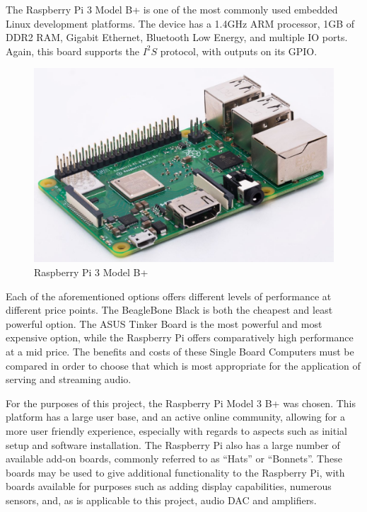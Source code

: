 \documentclass[11pt,a4paper,headinclude=false,footinclude=false]{scrreprt}
\begin{document}
The Raspberry Pi 3 Model B+ is one of the most commonly used embedded
Linux development platforms. The device has a 1.4GHz ARM processor, 1GB
of DDR2 RAM, Gigabit Ethernet, Bluetooth Low Energy, and multiple IO
ports. Again, this board supports the \(I^2S\) protocol, with outputs on
its GPIO\cite{RPI18}.

\begin{figure}[H]
\includegraphics{BackgroundLitSurvey/Rpi.jpg}
\centering
\caption{Raspberry Pi 3 Model B+\cite{RPI18}}
\label{RPiFig}
\end{figure}

Each of the aforementioned options offers different levels of
performance at different price points. The BeagleBone Black is both the
cheapest and least powerful option. The ASUS Tinker Board is the most
powerful and most expensive option, while the Raspberry Pi offers
comparatively high performance at a mid price. The benefits and costs of
these Single Board Computers must be compared in order to choose that
which is most appropriate for the application of serving and streaming
audio.

For the purposes of this project, the Raspberry Pi Model 3 B+ was
chosen. This platform has a large user base, and an active online
community, allowing for a more user friendly experience, especially with
regards to aspects such as initial setup and software installation. The
Raspberry Pi also has a large number of available add-on boards,
commonly referred to as ``Hats'' or ``Bonnets''. These boards may be
used to give additional functionality to the Raspberry Pi, with boards
available for purposes such as adding display capabilities, numerous
sensors, and, as is applicable to this project, audio DAC and
amplifiers.
\end{document}
